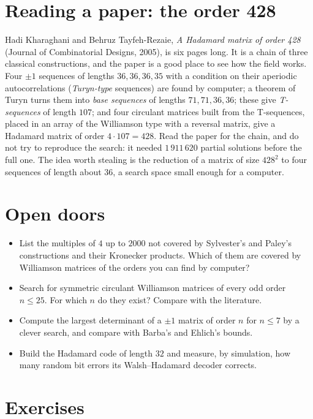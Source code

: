 \section{Reading a paper: the order 428}

Hadi Kharaghani and Behruz Tayfeh-Rezaie, \emph{A Hadamard matrix of order 428} (Journal of Combinatorial Designs, 2005), is six pages long. It is a
chain of three classical constructions, and the paper is a good place to see how the field works. Four $\pm1$ sequences of lengths $36,36,36,35$ with
a condition on their aperiodic autocorrelations (\emph{Turyn-type} sequences) are found by computer; a theorem of Turyn turns them into \emph{base
sequences} of lengths $71,71,36,36$; these give \emph{T-sequences} of length $107$; and four circulant matrices built from the T-sequences, placed in
an array of the Williamson type with a reversal matrix, give a Hadamard matrix of order $4\cdot107=428$. Read the paper for the chain, and do not try to
reproduce the search: it needed $1\,911\,620$ partial solutions before the full one. The idea worth stealing is the reduction of a matrix of size $428^2$
to four sequences of length about $36$, a search space small enough for a computer.

\section{Open doors}

\begin{itemize}
\item List the multiples of $4$ up to $2000$ not covered by Sylvester's and Paley's constructions and their Kronecker products. Which of them are
covered by Williamson matrices of the orders you can find by computer?
\item Search for symmetric circulant Williamson matrices of every odd order $n\le25$. For which $n$ do they exist? Compare with the literature.
\item Compute the largest determinant of a $\pm1$ matrix of order $n$ for $n\le7$ by a clever search, and compare with Barba's and Ehlich's bounds.
\item Build the Hadamard code of length $32$ and measure, by simulation, how many random bit errors its Walsh--Hadamard decoder corrects.
\end{itemize}

\section{Exercises}

